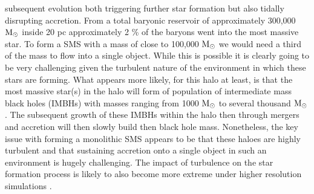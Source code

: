 \documentclass[graphics, twocolumn, usenatbib]{mn2e}
\newcommand{\msolar} {$\rm{M_{\odot}}~$}
\newcommand{\msolarc} {$\rm{M_{\odot}}$}
\begin{document}
subsequent evolution both triggering further star formation but also tidally disrupting accretion.
From a total baryonic reservoir of approximately 300,000 \msolar inside 20 pc approximately 2 \% of the baryons went into the most massive star. To form a SMS
with a mass of close to 100,000 \msolar we would need a third of the mass to 
flow into a single object. While this is possible it is clearly going to be 
very challenging given the turbulent nature of the environment in which these stars are forming. What appears more likely, for this halo at least, is that the 
most massive star(s) in the halo will form of population of intermediate mass black holes (IMBHs) with masses ranging from 1000 \msolar to several thousand \msolarc. The subsequent growth of these IMBHs within the halo then through 
mergers and accretion will then slowly build then black hole mass. 
Nonetheless, the key issue with forming a monolithic SMS appears to be that
these haloes are highly turbulent and that sustaining accretion onto a single
object in such an environment is hugely challenging. The impact of turbulence
on the star formation process is likely to also become more extreme under higher resolution
simulations \citep{}.
\end{document}
